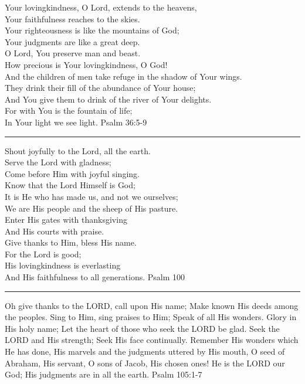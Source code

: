 \documentclass[]{book}
\begin{document}
Your lovingkindness, O Lord, extends to the heavens,\\
Your faithfulness reaches to the skies.\\
Your righteousness is like the mountains of God;\\
Your judgments are like a great deep.\\
O Lord, You preserve man and beast.\\
How precious is Your lovingkindness, O God!\\
And the children of men take refuge in the shadow of Your wings.\\
They drink their fill of the abundance of Your house;\\
And You give them to drink of the river of Your delights.\\
For with You is the fountain of life;\\
In Your light we see light. \textbar{} Psalm 36:5-9

\begin{center}\rule{0.5\linewidth}{\linethickness}\end{center}

Shout joyfully to the Lord, all the earth.\\
Serve the Lord with gladness;\\
Come before Him with joyful singing.\\
Know that the Lord Himself is God;\\
It is He who has made us, and not we ourselves;\\
We are His people and the sheep of His pasture.\\

Enter His gates with thanksgiving\\
And His courts with praise.\\
Give thanks to Him, bless His name.\\
For the Lord is good;\\
His lovingkindness is everlasting\\
And His faithfulness to all generations. \textbar{} Psalm 100

\begin{center}\rule{0.5\linewidth}{\linethickness}\end{center}

Oh give thanks to the LORD, call upon His name; Make known His deeds among the peoples. Sing to Him, sing praises to Him; Speak of all His wonders. Glory in His holy name; Let the heart of those who seek the LORD be glad. Seek the LORD and His strength; Seek His face continually. Remember His wonders which He has done, His marvels and the judgments uttered by His mouth, O seed of Abraham, His servant, O sons of Jacob, His chosen ones! He is the LORD our God; His judgments are in all the earth. \textbar{} Psalm 105:1-7
\end{document}
